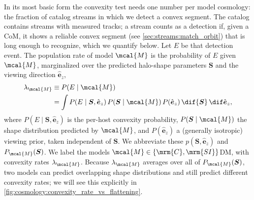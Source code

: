 \documentclass[linenumbers,twocolumn]{aastex701}
\renewcommand{\mbf}[1]{\boldsymbol{#1}}
\newcommand{\zhat}{\hat{\mbf{e}}_z} %
\newcommand{\lamM}{\ensuremath{\lambda_{\mcal{M}}}}   %
\begin{document}
        In its most basic form the convexity test needs one number per model cosmology: the fraction of catalog streams in which we detect a convex segment. %
        The catalog contains streams with measured tracks; a stream counts as a detection if, given a \gls{CoM}, it shows a reliable convex segment (see \autoref{sec:streams:match_orbit}) that is long enough to recognize, which we quantify below. %
        Let $E$ be that detection event. %
        The population rate of model $\mcal{M}$ is the probability of $E$ given $\mcal{M}$, marginalized over the predicted halo-shape parameters $\mbf{S}$ and the viewing direction $\zhat$, %
        \begin{align}\label{eq:cosmology:p_M}
            \lamM
            &\equiv P(E\mid\mcal{M}) \\
            &= \int P(E\mid\mbf{S},\zhat)\,P(\mbf{S}\mid\mcal{M})\,P(\zhat)\,\dif{\mbf{S}}\,\dif\zhat, %
        \end{align}
        where $P(E\mid\mbf{S},\zhat)$ is the per-host convexity probability, $P(\mbf{S}\mid\mcal{M})$ the shape distribution predicted by $\mcal{M}$, and $P(\zhat)$ a (generally isotropic) viewing prior, taken independent of $\mbf{S}$. %
        We abbreviate these $p(\mbf{S},\zhat)$ and $P_{\mcal{M}}(\mbf{S})$. %
        We label the models $\mcal{M}\in\{\mrm{C},\mrm{SI}\}$DM, with convexity rates $\lamM$. %
        Because $\lamM$ averages over all of $P_{\mcal{M}}(\mbf{S})$, two models can predict overlapping shape distributions and still predict different convexity rates; we will see this explicitly in \autoref{fig:cosmology:convexity_rate_vs_flattening}. %
\end{document}
